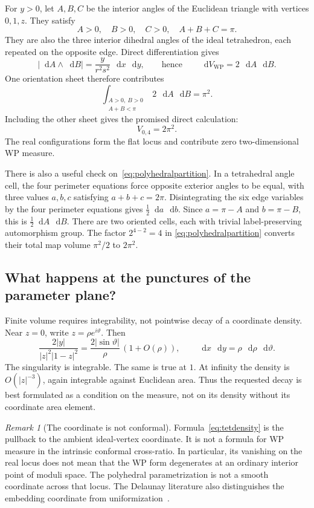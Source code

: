\documentclass[11pt,a4paper]{article}
\numberwithin{equation}{section}
\theoremstyle{definition}
\theoremstyle{remark}
\newtheorem{remark}[theorem]{Remark}
\newcommand{\dd}{\mathop{}\!\mathrm d}
\newcommand{\WP}{\mathrm{WP}}
\newcommand{\dV}{\dd V_{\WP}}
\newcommand{\abs}[1]{\left|#1\right|}
\begin{document}
For $y>0$, let $A,B,C$ be the interior angles of the Euclidean triangle
with vertices $0,1,z$. They satisfy
\[
 A>0,\quad B>0,\quad C>0,\quad A+B+C=\pi.
\]
They are also the three interior dihedral angles of the ideal tetrahedron,
each repeated on the opposite edge. Direct differentiation gives
\[
 \abs{\dd A\wedge\dd B}
   =\frac{y}{r^2s^2}\,\dd x\,\dd y,
 \qquad\text{hence}\qquad
 \dV=2\,\dd A\,\dd B.
\]
One orientation sheet therefore contributes
\begin{equation}
 \int_{\substack{A>0,\ B>0\\A+B<\pi}}2\,\dd A\,\dd B=\pi^2.
 \label{eq:onecell}
\end{equation}
Including the other sheet gives the promised direct calculation:
\begin{equation}
 \boxed{V_{0,4}=2\pi^2.}
 \label{eq:v04direct}
\end{equation}
The real configurations form the flat locus and contribute zero two-dimensional
WP measure.

There is also a useful check on~\eqref{eq:polyhedralpartition}. In a
tetrahedral angle cell, the four perimeter equations force opposite exterior
angles to be equal, with three values $a,b,c$ satisfying $a+b+c=2\pi$.
Disintegrating the six edge variables by the four perimeter equations gives
$\frac12\dd a\,\dd b$. Since $a=\pi-A$ and $b=\pi-B$, this is
$\frac12\dd A\,\dd B$. There are two oriented cells, each with trivial
label-preserving automorphism group. The factor $2^{4-2}=4$ in
\eqref{eq:polyhedralpartition} converts their total map volume $\pi^2/2$
to $2\pi^2$.

\subsection{What happens at the punctures of the parameter plane?}

Finite volume requires integrability, not pointwise decay of a coordinate
density. Near $z=0$, write $z=\rho e^{i\vartheta}$. Then
\[
 \frac{2|y|}{|z|^2|1-z|^2}
 =\frac{2|\sin\vartheta|}{\rho}\,(1+O(\rho)),
 \qquad \dd x\,\dd y=\rho\,\dd\rho\,\dd\vartheta.
\]
The singularity is integrable. The same is true at $1$. At infinity the
density is $O(|z|^{-3})$, again integrable against Euclidean area. Thus the
requested decay is best formulated as a condition on the measure, not on
its density without its coordinate area element.

\begin{remark}[The coordinate is not conformal]
Formula~\eqref{eq:tetdensity} is the pullback to the ambient ideal-vertex
coordinate. It is not a formula for WP measure in the intrinsic conformal
cross-ratio. In particular, its vanishing on the real locus does not mean
that the WP form degenerates at an ordinary interior point of moduli space.
The polyhedral parametrization is not a smooth coordinate across that locus.
The Delaunay literature also distinguishes the embedding coordinate from
uniformization~\cite[Section 3.3.1]{CDE}.
\end{remark}
\end{document}
